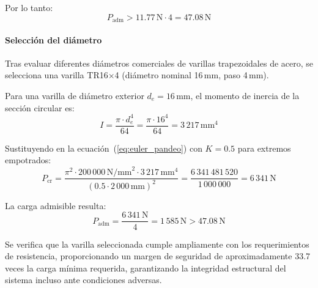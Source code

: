 Por lo tanto:
\[P_{\text{adm}} > 11.77\,\text{N} \cdot 4 = 47.08\,\text{N}\]

\paragraph{Selección del diámetro}
Tras evaluar diferentes diámetros comerciales de varillas trapezoidales de acero, se selecciona una varilla TR16$\times$4 (diámetro nominal 16\,mm, paso 4\,mm).

Para una varilla de diámetro exterior $d_e = 16$\,mm, el momento de inercia de la sección circular es:
\[I = \frac{\pi \cdot d_e^4}{64} = \frac{\pi \cdot 16^4}{64} = 3\,217\,\text{mm}^4\]

Sustituyendo en la ecuación~(\ref{eq:euler_pandeo}) con $K = 0.5$ para extremos empotrados:
\[P_{\text{cr}} = \frac{\pi^2 \cdot 200\,000\,\text{N/mm}^2 \cdot 3\,217\,\text{mm}^4}{(0.5 \cdot 2\,000\,\text{mm})^2} = \frac{6\,341\,481\,520}{1\,000\,000} = 6\,341\,\text{N}\]

La carga admisible resulta:
\[P_{\text{adm}} = \frac{6\,341\,\text{N}}{4} = 1\,585\,\text{N} > 47.08\,\text{N}\]

Se verifica que la varilla seleccionada cumple ampliamente con los requerimientos de resistencia, proporcionando un margen de seguridad de aproximadamente 33.7 veces la carga mínima requerida, garantizando la integridad estructural del sistema incluso ante condiciones adversas.

